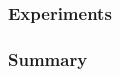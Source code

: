 \subsubsection{Experiments}
\label{subsubsec:expcomm2}
\subsubsection{Summary}
\label{subsubsec:summary1}
